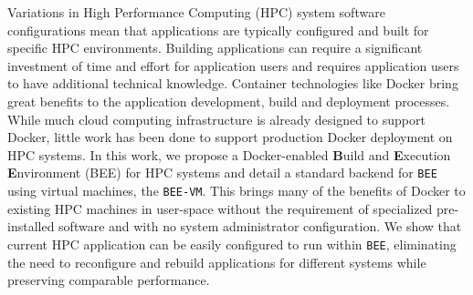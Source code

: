 Variations in High Performance Computing (HPC) system software configurations mean that applications are typically configured and built for specific HPC environments. Building applications can require a significant investment of time and effort for application users and requires application users to have additional technical knowledge. Container technologies like Docker bring great benefits to the application development, build and deployment processes. While much cloud computing infrastructure is already designed to support Docker, little work has been done to support production Docker deployment on HPC systems. In this work, we propose a Docker-enabled \textbf{B}uild and \textbf{E}xecution \textbf{E}nvironment (BEE) for HPC systems and detail a standard backend for \texttt{BEE} using virtual machines, the \texttt{BEE-VM}. This brings many of the benefits of Docker to existing HPC machines in user-space without the requirement of specialized pre-installed software and with no system administrator configuration. We show that current HPC application can be easily configured to run within \texttt{BEE}, eliminating the need to reconfigure and rebuild applications for different systems while preserving comparable performance. 
